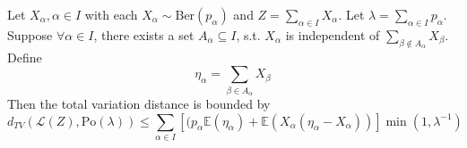 \documentclass{article}
\begin{document}
\begin{theorem}\label{thm:poisson_stein_local}
    Let $X_\alpha, \alpha \in I$ with each $X_\alpha \sim \text{Ber}(p_\alpha)$ and $Z = \sum_{\alpha \in I} X_\alpha$. Let $\lambda = \sum_{\alpha \in I} p_\alpha$. Suppose $\forall \alpha \in I$, there exists a set $A_\alpha \subseteq I$, s.t. $X_\alpha$ is independent of $\sum_{\beta \notin A_\alpha} X_\beta$. Define 
    \begin{equation*}
        \eta_\alpha = \sum_{\beta \in A_\alpha} X_\beta
    \end{equation*}
    Then the total variation distance is bounded by
    \begin{equation*}
        d_{TV}(\mathcal{L}(Z), \text{Po}(\lambda)) \leq \sum_{\alpha\in I}[(p_{\alpha}\mathbb{E}(\eta_{\alpha})+\mathbb{E}(X_{\alpha}(\eta_{\alpha}-X_{\alpha}))]\operatorname*{min}\left(1,\lambda^{-1}\right)
    \end{equation*}
\end{theorem}
\end{document}

